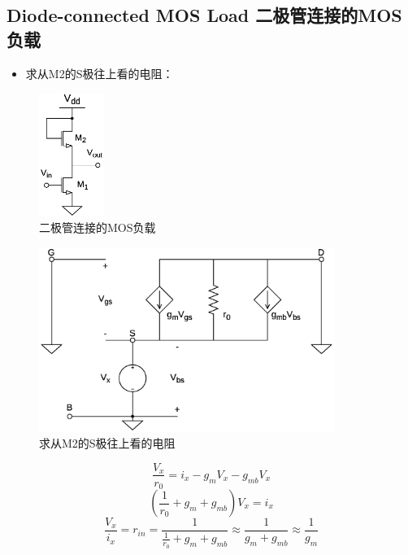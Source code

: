 \documentclass[twoside,a4paper,openright,titlepage,draft]{ctexrep}
\begin{document}
\subsection{Diode-connected MOS Load 二极管连接的MOS负载\\}
\begin{multicols}{2}
    \begin{itemize}
        \item 求从M2的S极往上看的电阻：
    \end{itemize}
    \columnbreak
    \begin{figure}[H]
        \centering
        \includegraphics[height=40mm]{diode-connectedload.eps}
        \caption{二极管连接的MOS负载}
        \label{fig:二级管连接的MOS负载}
    \end{figure}
\end{multicols}

\begin{multicols}{2}
    \begin{figure}
        \centering
        \includegraphics[height=60mm]{sourceimpedence.eps}
        \caption{求从M2的S极往上看的电阻}
        \label{fig:求从M2的S极往上看的电阻}
    \end{figure}        
\end{multicols}
\newpage
\begin{equation}
    \frac{V_x}{r_0} = i_x - g_mV_x - g_{mb}V_x
\end{equation}
\begin{equation}
    (\frac{1}{r_0} + g_m + g_{mb})V_x = i_x
\end{equation}
\begin{equation}
    \frac{V_x}{i_x} = r_{in} = \frac{1}{\frac{1}{r_0} + g_m + g_{mb}}
    \approx \frac{1}{g_m + g_{mb}} \approx \frac{1}{g_m}
\end{equation}
\end{document}
